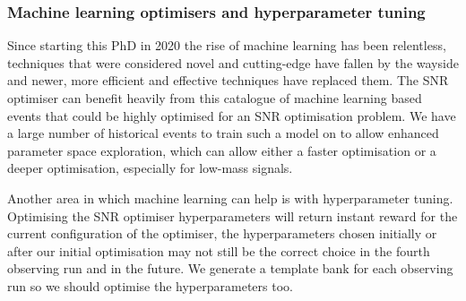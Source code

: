 \subsubsection{Machine learning optimisers and hyperparameter tuning}

Since starting this PhD in 2020 the rise of machine learning has been relentless, techniques that were considered novel and cutting-edge have fallen by the wayside and newer, more efficient and effective techniques have replaced them. The SNR optimiser can benefit heavily from this catalogue of machine learning based events that could be highly optimised for an SNR optimisation problem. We have a large number of historical events to train such a model on to allow enhanced parameter space exploration, which can allow either a faster optimisation or a deeper optimisation, especially for low-mass signals.

Another area in which machine learning can help is with hyperparameter tuning. Optimising the SNR optimiser hyperparameters will return instant reward for the current configuration of the optimiser, the hyperparameters chosen initially or after our initial optimisation may not still be the correct choice in the fourth observing run and in the future. We generate a template bank for each observing run so we should optimise the hyperparameters too.





